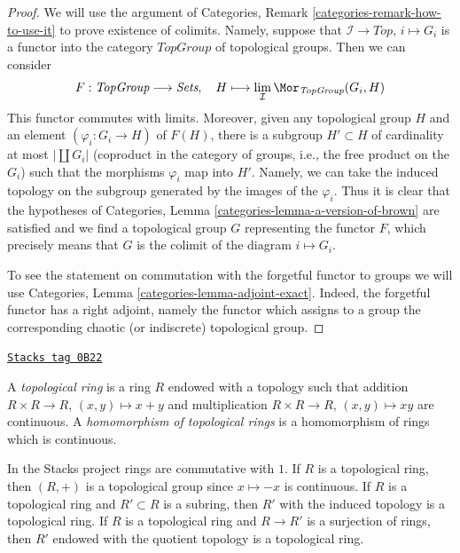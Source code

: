 \begin{proof}
We will use the argument of
Categories, Remark \ref{categories-remark-how-to-use-it} to prove
existence of colimits. Namely, suppose
that $\mathcal{I} \to \textit{Top}$, $i \mapsto G_i$ is a functor
into the category $\textit{TopGroup}$ of topological groups.
Then we can consider
$$
F : \textit{TopGroup} \longrightarrow \textit{Sets},\quad
H \longmapsto \lim_\mathcal{I} \Mor_{\textit{TopGroup}}(G_i, H)
$$
This functor commutes with limits. Moreover, given any topological group
$H$ and an element $(\varphi_i : G_i \to H)$ of $F(H)$, there is
a subgroup $H' \subset H$ of cardinality at most $|\coprod G_i|$
(coproduct in the category of groups, i.e., the free product on the $G_i$)
such that the morphisms $\varphi_i$ map into $H'$. Namely, we can
take the induced topology on the subgroup generated by the images
of the $\varphi_i$. Thus it is clear that the hypotheses of
Categories, Lemma \ref{categories-lemma-a-version-of-brown}
are satisfied and we find a topological group $G$
representing the functor $F$, which precisely means that $G$ is
the colimit of the diagram $i \mapsto G_i$.

\medskip\noindent
To see the statement on commutation with the forgetful functor to
groups we will use
Categories, Lemma \ref{categories-lemma-adjoint-exact}.
Indeed, the forgetful functor has a right adjoint, namely the functor which
assigns to a group the corresponding chaotic (or indiscrete) topological group.
\end{proof}

\begin{definition}
\label{topology-definition-topological-ring}
\href{https://stacks.math.columbia.edu/tag/0B22}{\texttt{Stacks tag 0B22}}

A {\it topological ring} is a ring $R$ endowed with a topology
such that addition $R \times R \to R$, $(x, y) \mapsto x + y$ and
multiplication $R \times R \to R$, $(x, y) \mapsto xy$ are continuous.
A {\it homomorphism of topological rings} is a homomorphism of rings
which is continuous.
\end{definition}

In the Stacks project rings are commutative with $1$. If $R$
is a topological ring, then $(R, +)$ is a topological group
since $x \mapsto -x$ is continuous.
If $R$ is a topological ring and $R' \subset R$ is a subring,
then $R'$ with the induced topology is a topological ring.
If $R$ is a topological ring and $R \to R'$ is a surjection of
rings, then $R'$ endowed with the quotient topology is a topological
ring.

